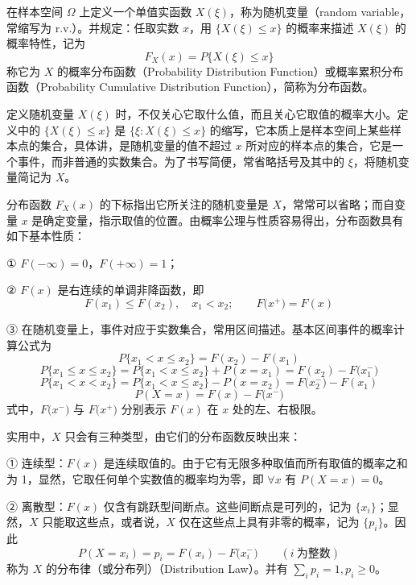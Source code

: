\documentclass[11pt,openany,UTF8]{ctexbook}
\begin{document}
在样本空间 $\Omega$ 上定义一个单值实函数 $X(\xi)$\nobreak，称为随机变量（random variable\nobreak，常缩写为 r.v.\nobreak）\nobreak。并规定\nobreak：任取实数 $x$\nobreak，用 $\{X(\xi)\leqslant x\}$ 的概率来描述 $X(\xi)$ 的概率特性\nobreak，记为
\begin{equation}
F_X(x)=P\{X(\xi)\leqslant x\}
\label{eq:1.7}
\end{equation}
称它为 $X$ 的概率分布函数（Probability Distribution Function\nobreak）或概率累积分布函数（Probability Cumulative Distribution Function\nobreak）\nobreak，简称为分布函数\nobreak。

定义随机变量 $X(\xi)$ 时\nobreak，不仅关心它取什么值\nobreak，而且关心它取值的概率大小\nobreak。定义中的 $\{X(\xi)\leqslant x\}$ 是 $\{\xi: X(\xi)\leqslant x\}$ 的缩写\nobreak，它本质上是样本空间上某些样本点的集合\nobreak，具体讲\nobreak，是随机变量的值不超过 $x$ 所对应的样本点的集合\nobreak，它是一个事件\nobreak，而非普通的实数集合\nobreak。为了书写简便\nobreak，常省略括号及其中的 $\xi$\nobreak，将随机变量简记为 $X$\nobreak。

分布函数 $F_X(x)$ 的下标指出它所关注的随机变量是 $X$\nobreak，常常可以省略\nobreak；而自变量 $x$ 是确定变量\nobreak，指示取值的位置\nobreak。由概率公理与性质容易得出\nobreak，分布函数具有如下基本性质\nobreak：

① $F(-\infty)=0$\nobreak，$F(+\infty)=1$\nobreak；

② $F(x)$ 是右连续的单调非降函数\nobreak，即
\[
F(x_1)\leqslant F(x_2),\quad x_1<x_2;\qquad F\bigl(x^+\bigr)=F(x)
\]

③ 在随机变量上\nobreak，事件对应于实数集合\nobreak，常用区间描述\nobreak。基本区间事件的概率计算公式为
\[
P\{x_1<x\leqslant x_2\}=F(x_2)-F(x_1)
\]
\[
P\{x_1\leqslant x\leqslant x_2\}=P\{x_1<x\leqslant x_2\}+P(x=x_1)=F(x_2)-F\bigl(x_1^-\bigr)
\]
\[
P\{x_1<x<x_2\}=P\{x_1<x\leqslant x_2\}-P(x=x_2)=F\bigl(x_2^-\bigr)-F(x_1)
\]
\[
P(X=x)=F(x)-F\bigl(x^-\bigr)
\]
式中\nobreak，$F\bigl(x^-\bigr)$ 与 $F\bigl(x^+\bigr)$ 分别表示 $F(x)$ 在 $x$ 处的左\nobreak、右极限\nobreak。

实用中\nobreak，$X$ 只会有三种类型\nobreak，由它们的分布函数反映出来\nobreak：

① 连续型\nobreak：$F(x)$ 是连续取值的\nobreak。由于它有无限多种取值而所有取值的概率之和为 1\nobreak，显然\nobreak，它取任何单个实数值的概率均为零\nobreak，即 $\forall x$ 有 $P(X=x)=0$\nobreak。

② 离散型\nobreak：$F(x)$ 仅含有跳跃型间断点\nobreak。这些间断点是可列的\nobreak，记为 $\{x_i\}$\nobreak；显然\nobreak，$X$ 只能取这些点\nobreak，或者说\nobreak，$X$ 仅在这些点上具有非零的概率\nobreak，记为 $\{p_i\}$\nobreak。因此
\[
P(X=x_i)=p_i=F(x_i)-F\bigl(x_i^-\bigr)\qquad (i\ \text{为整数})
\]
称为 $X$ 的分布律（或分布列\nobreak）（Distribution Law\nobreak）\nobreak。并有 $\sum\limits_{i}p_i=1,p_i\geqslant 0$\nobreak。
\end{document}
